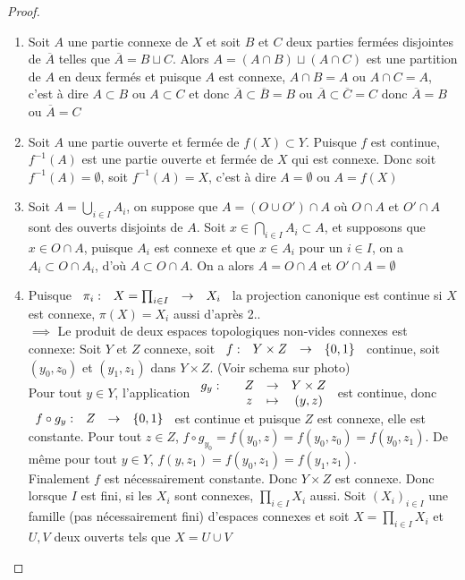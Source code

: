 \documentclass[]{report}
\begin{document}
    \begin{proof}
        \begin{enumerate}
            \item Soit $A$ une partie connexe de $X$ et soit $B$ et $C$ deux parties fermées disjointes de $\overline{A}$ telles que $\overline{A}=B\sqcup C$. Alors $A=(A\cap B)\sqcup(A\cap C)$ est une partition de $A$ en deux fermés et puisque $A$ est connexe, $A\cap B=A$ ou $A\cap C=A$, c'est à dire $A\subset B$ ou $A\subset C$ et donc $\overline{A}\subset \overline{B}=B$ ou $\overline{A}\subset \overline{C}=C$ donc $\overline{A}=B$ ou $\overline{A}=C$
            \item Soit $A$ une partie ouverte et fermée de $f(X)\subset Y$. Puisque $f$ est continue, $f^{-1}(A)$ est une partie ouverte et fermée de $X$ qui est connexe. Donc soit $f^{-1}(A)=\emptyset$, soit $f^{-1}(A)=X$, c'est à dire $A=\emptyset$ ou $A=f(X)$
            \item Soit $A=\bigcup_{i\in I}A_i$, on suppose que $A=(O\cup O')\cap A$ où $O\cap A$ et $O'\cap A$ sont des ouverts disjoints de $A$. Soit $x\in \bigcap_{i\in I}A_i \subset A$, et supposons que $x\in O\cap A$, puisque $A_i$ est connexe et que $x\in A_i$ pour un $i\in I$, on a $A_i\subset O\cap A_i$, d'où $A\subset O\cap A$. On a alors $A=O\cap A$ et $O'\cap A=\emptyset$
            \item Puisque $\begin{array}{ccccc} \pi_i : & X=\prod_{i\in I} & \to & X_i \end{array}$ la projection canonique est continue si $X$ est connexe, $\pi(X)=X_i$ aussi d'après 2..\\
            $\implies$ Le produit de deux espaces topologiques non-vides connexes est connexe: Soit $Y$ et $Z$ connexe, soit $\begin{array}{ccccc} f : & Y\times Z & \to & \{0,1\} \end{array}$ continue, soit $(y_0,z_0)$ et $(y_1,z_1)$ dans $Y\times Z$. (Voir schema sur photo)\\
            Pour tout $y\in Y$, l'application $\begin{array}{ccccc} g_y : & & Z & \to & Y\times Z \\ & & z & \mapsto & (y,z) \end{array}$ est continue, donc $\begin{array}{ccccc} f\circ g_y : & Z & \to & \{0,1\} \end{array}$ est continue et puisque $Z$ est connexe, elle est constante. Pour tout $z\in Z$, $f\circ g_{y_0}=f(y_0,z)=f(y_0,z_0)=f(y_0,z_1)$. De même pour tout $y\in Y$, $f(y,z_1)=f(y_0,z_1)=f(y_1,z_1)$.\\
            Finalement $f$ est nécessairement constante. Donc $Y\times Z$ est connexe. Donc lorsque $I$ est fini, si les $X_i$ sont connexes, $\prod_{i\in I}X_i$ aussi. Soit $(X_i)_{i\in I}$ une famille (pas nécessairement fini) d'espaces connexes et soit $X=\prod_{i\in I}X_i$ et $U,V$ deux ouverts tels que $X=U\cup V$\\

\end{enumerate}
\end{proof}
\end{document}
